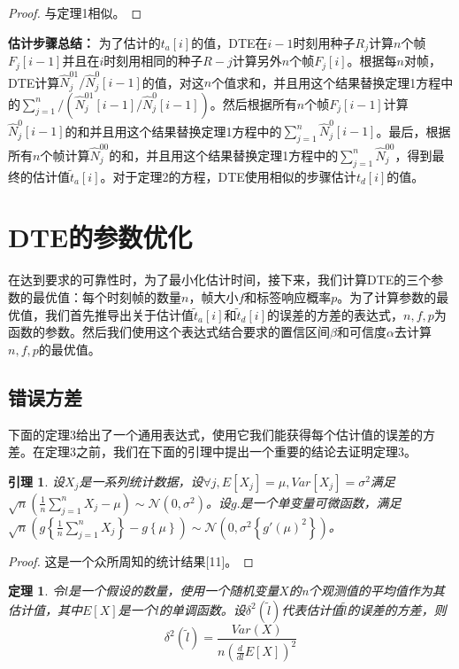 \documentclass[UTF8]{ctexart}
\newtheorem{theorem}{定理}
\newtheorem{lemma}{引理}
\newtheorem*{proof}{证明}
\begin{document}
	\begin{proof}
		与定理1相似。
	\end{proof}
	
	\textbf{估计步骤总结：}
	为了估计的$t_a[i]$的值，DTE在$i-1$时刻用种子$R_j$计算$n$个帧$F_j[i-1]$并且在$i$时刻用相同的种子$R-j$计算另外$n$个帧$F_j[i]$。根据每$n$对帧，DTE计算$\hat{N}^{01}_j/\hat{N}^0_j[i-1]$的值，对这$n$个值求和，并且用这个结果替换定理1方程中的$\sum_{j=1}^{n}/\left(\hat{N}^{01}_j[i-1]/\hat{N}^0_j[i-1]\right)$。然后根据所有$n$个帧$F_j[i-1]$计算$\hat{N}^0_j[i-1]$的和并且用这个结果替换定理1方程中的$\sum_{j=1}^{n}\hat{N}^0_j[i-1]$。最后，根据所有$n$个帧计算$\hat{N}^{00}_j$的和，并且用这个结果替换定理1方程中的$\sum_{j=1}^{n}\hat{N}^{00}_j$，得到最终的估计值$\widetilde{t}_a[i]$。对于定理2的方程，DTE使用相似的步骤估计$t_d[i]$的值。
	
	\section{DTE的参数优化}
	在达到要求的可靠性时，为了最小化估计时间，接下来，我们计算DTE的三个参数的最优值：每个时刻帧的数量$n$，帧大小$f$和标签响应概率$p$。为了计算参数的最优值，我们首先推导出关于估计值$\widetilde{t}_a[i]$和$\widetilde{t}_d[i]$的误差的方差的表达式，$n,f,p$为函数的参数。然后我们使用这个表达式结合要求的置信区间$\beta$和可信度$\alpha$去计算$n,f,p$的最优值。
	
	\subsection{错误方差}
	下面的定理3给出了一个通用表达式，使用它我们能获得每个估计值的误差的方差。在定理3之前，我们在下面的引理中提出一个重要的结论去证明定理3。
	
	\begin{lemma}
		设$X_j$是一系列统计数据，设$\forall j,E[X_j]=\mu,Var[X_j]=\sigma^2$满足$\sqrt{n}\left(\frac{1}{n}\sum_{j=1}^{n}X_j-\mu\right)\sim \mathcal{N}(0,\sigma^2)$。设$g{.}$是一个单变量可微函数，满足\\$\sqrt{n}\left(g\left\{\frac{1}{n}\sum_{j=1}^{n}X_j\right\}-g\left\{\mu\right\}\right)\sim \mathcal{N}\left(0,\sigma^2\left\{g'(\mu)^2\right\}\right)$。
	\end{lemma}
	
	\begin{proof}
		这是一个众所周知的统计结果[11]。
	\end{proof}
	
	\begin{theorem}
		令$l$是一个假设的数量，使用一个随机变量$X$的n个观测值的平均值作为其估计值，其中$E[X]$是一个$l$的单调函数。设$\delta^2(\widetilde{l})$代表估计值$\widetilde{l}$的误差的方差，则
		\begin{equation}
		\delta^2(\widetilde{l})=\frac{Var\left(X\right)}{n\left(\frac{d}{dl}E[X]\right)^2}
		\end{equation}
	\end{theorem}
	
\end{document}
